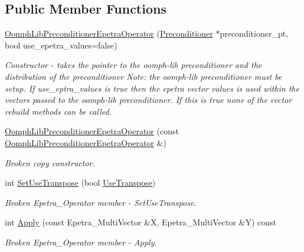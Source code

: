\subsection*{Public Member Functions}
\begin{DoxyCompactItemize}
\item 
\hyperlink{classoomph_1_1OomphLibPreconditionerEpetraOperator_ac32c701f4fb54f65e2701b984f41ada3}{Oomph\+Lib\+Preconditioner\+Epetra\+Operator} (\hyperlink{classoomph_1_1Preconditioner}{Preconditioner} $\ast$preconditioner\+\_\+pt, bool use\+\_\+epetra\+\_\+values=false)
\begin{DoxyCompactList}\small\item\em Constructor -\/ takes the pointer to the oomph-\/lib preconditioner and the distribution of the preconditioner Note\+: the oomph-\/lib preconditioner must be setup. If use\+\_\+eptra\+\_\+values is true then the epetra vector values is used within the vectors passed to the oomph-\/lib preconditioner. If this is true none of the vector rebuild methods can be called. \end{DoxyCompactList}\item 
\hyperlink{classoomph_1_1OomphLibPreconditionerEpetraOperator_a14c3de93104f38c7b7185f8db2774a05}{Oomph\+Lib\+Preconditioner\+Epetra\+Operator} (const \hyperlink{classoomph_1_1OomphLibPreconditionerEpetraOperator}{Oomph\+Lib\+Preconditioner\+Epetra\+Operator} \&)
\begin{DoxyCompactList}\small\item\em Broken copy constructor. \end{DoxyCompactList}\item 
int \hyperlink{classoomph_1_1OomphLibPreconditionerEpetraOperator_acfeb8c93b3361cc68def1051ccc8525a}{Set\+Use\+Transpose} (bool \hyperlink{classoomph_1_1OomphLibPreconditionerEpetraOperator_aa70ab70fe3188e78fc623d3240f7af19}{Use\+Transpose})
\begin{DoxyCompactList}\small\item\em Broken Epetra\+\_\+\+Operator member -\/ Set\+Use\+Transpose. \end{DoxyCompactList}\item 
int \hyperlink{classoomph_1_1OomphLibPreconditionerEpetraOperator_ade98cb5d53423f32f31a152f9dcc2ce6}{Apply} (const Epetra\+\_\+\+Multi\+Vector \&X, Epetra\+\_\+\+Multi\+Vector \&Y) const
\begin{DoxyCompactList}\small\item\em Broken Epetra\+\_\+\+Operator member -\/ Apply. \end{DoxyCompactList}\item 

\end{DoxyCompactItemize}
